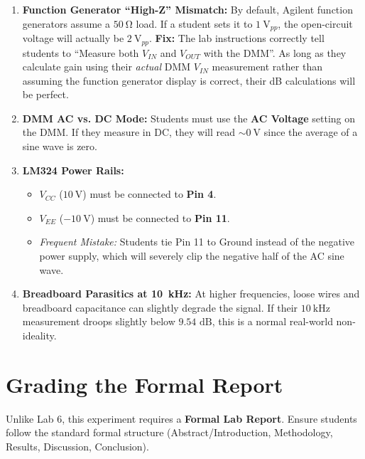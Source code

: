\documentclass[11pt]{article}
\begin{document}
\begin{enumerate}
  \item \textbf{Function Generator ``High-Z'' Mismatch:} By default, Agilent function generators assume a $\SI{50}{\ohm}$ load. If a student sets it to $\SI{1}{\volt}_{pp}$, the open-circuit voltage will actually be $\SI{2}{\volt}_{pp}$. \textbf{Fix:} The lab instructions correctly tell students to ``Measure both $V_{IN}$ and $V_{OUT}$ with the DMM''. As long as they calculate gain using their \textit{actual} DMM $V_{IN}$ measurement rather than assuming the function generator display is correct, their dB calculations will be perfect.

  \item \textbf{DMM AC vs. DC Mode:} Students must use the \textbf{AC Voltage} setting on the DMM. If they measure in DC, they will read $\sim \SI{0}{\volt}$ since the average of a sine wave is zero.

  \item \textbf{LM324 Power Rails:}
    \begin{itemize}
      \item $V_{CC}$ ($\SI{+10}{\volt}$) must be connected to \textbf{Pin 4}.
      \item $V_{EE}$ ($\SI{-10}{\volt}$) must be connected to \textbf{Pin 11}.
      \item \textit{Frequent Mistake:} Students tie Pin 11 to Ground instead of the negative power supply, which will severely clip the negative half of the AC sine wave.
    \end{itemize}

  \item \textbf{Breadboard Parasitics at \SI{10}{\kilo\hertz}:} At higher frequencies, loose wires and breadboard capacitance can slightly degrade the signal. If their $\SI{10}{\kilo\hertz}$ measurement droops slightly below $9.54 \text{ dB}$, this is a normal real-world non-ideality.
\end{enumerate}

\vspace{0.2in}
\section*{Grading the Formal Report}

Unlike Lab 6, this experiment requires a \textbf{Formal Lab Report}. Ensure students follow the standard formal structure (Abstract/Introduction, Methodology, Results, Discussion, Conclusion).
\end{document}
